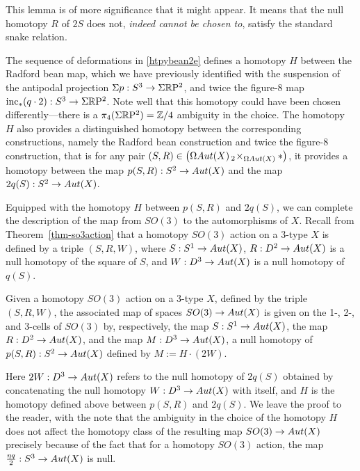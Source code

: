 \documentclass{amsart}
\begin{document}
\begin{remark}
This lemma is of more significance that it might appear.  It means that the null homotopy $R$ of $2S$ does not, \emph{indeed cannot be chosen to}, satisfy the standard snake relation.
\end{remark}
The sequence of deformations in \cref{htpybean2e} defines a homotopy $H$ between the Radford bean map, which we have previously identified with the suspension of the antipodal projection $\Sigma p : S^3 \rightarrow \Sigma \mathbb R \mathrm{P}^2$, and twice the figure-8 map $\mathrm{inc}_*(q \cdot 2) : S^3 \rightarrow \Sigma \mathbb R \mathrm{P}^2$.  Note well that this homotopy could have been chosen differently---there is a $\pi_4(\Sigma\mathbb R \mathrm{P}^2) = \mathbb Z/4$ ambiguity in the choice.  The homotopy $H$ also provides a distinguished homotopy between the corresponding constructions, namely the Radford bean construction and twice the figure-8 construction, that is for any pair $(S, R) \in \left(\Omega Aut(X) \,_2\! \times_{\Omega Aut(X)} \ast\right)$, it provides a homotopy between the map $p(S,R): S^2 \rightarrow Aut(X)$ and the map $2 q(S): S^2 \rightarrow Aut(X)$.

Equipped with the homotopy $H$ between $p(S,R)$ and $2 q(S)$, we can complete the description of the map from $SO(3)$ to the automorphisms of $X$.  Recall from Theorem~\ref{thm-so3action} that a homotopy $SO(3)$ action on a 3-type $X$ is defined by a triple $(S,R,W)$, where $S: S^1 \rightarrow Aut(X)$, $R: D^2 \rightarrow Aut(X)$ is a null homotopy of the square of $S$, and $W: D^3 \rightarrow Aut(X)$ is a null homotopy of $q(S)$.
\begin{proposition} 
\label{prop-so3map}
Given a homotopy $SO(3)$ action on a 3-type $X$, defined by the triple $(S,R,W)$, the associated map of spaces $SO(3) \rightarrow Aut(X)$ is given on the 1-, 2-, and 3-cells of $SO(3)$ by, respectively, the map $S: S^1 \rightarrow Aut(X)$, the map $R: D^2 \rightarrow Aut(X)$, and the map $M: D^3 \rightarrow Aut(X)$, a null homotopy of $p(S,R): S^2 \rightarrow Aut(X)$ defined by $M:=H \cdot (2 W)$.
\end{proposition}
\nid Here $2 W: D^3 \rightarrow Aut(X)$ refers to the null homotopy of $2 q(S)$ obtained by concatenating the null homotopy $W: D^3 \rightarrow Aut(X)$ with itself, and $H$ is the homotopy defined above between $p(S,R)$ and $2 q(S)$.  We leave the proof to the reader, with the note that the ambiguity in the choice of the homotopy $H$ does not affect the homotopy class of the resulting map $SO(3) \rightarrow Aut(X)$ precisely because of the fact that for a homotopy $SO(3)$ action, the map $\frac{\eta q}{2}: S^3 \rightarrow Aut(X)$ is null. 
\end{document}
